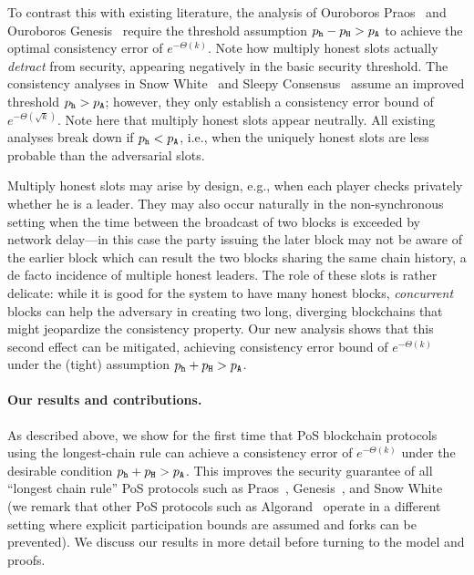 To contrast this with existing literature, the analysis of Ouroboros
Praos~\cite{Praos} and Ouroboros Genesis~\cite{Genesis}
require the threshold assumption $p_{\mathtt{h}} - p_{\mathtt{H}} > p_{\mathtt{A}}$ to achieve the
optimal consistency error of $e^{-\Theta(k)}$. Note how multiply
honest slots actually \emph{detract} from security, appearing
negatively in the basic security threshold. The consistency analyses
in Snow White~\cite{SnowWhite} and Sleepy Consensus~\cite{Sleepy}
assume an improved threshold $p_{\mathtt{h}} > p_{\mathtt{A}}$; however, they only
establish a consistency error bound of $e^{-\Theta(\sqrt{k})}$. Note
here that multiply honest slots appear neutrally. All existing
analyses break down if $p_{\mathtt{h}} < p_{\mathtt{A}}$, i.e., when the uniquely
honest slots are less probable than the adversarial slots.


Multiply honest slots may arise by design, e.g., when each player
checks privately whether he is a leader.  They may also occur
naturally in the non-synchronous setting when the time between the
broadcast of two blocks is exceeded by network delay---in this case
the party issuing the later block may not be aware of the earlier
block which can result the two blocks sharing the same chain history,
a de facto incidence of multiple honest leaders. The role of these
slots is rather delicate: while it is good for the system to have many
honest blocks, \emph{concurrent} blocks can help the adversary in
creating two long, diverging blockchains that might jeopardize the
consistency property. Our new analysis shows that this second effect
can be mitigated, achieving consistency error bound of
$e^{-\Theta(k)}$ under the (tight) assumption $p_{\mathtt{h}} + p_{\mathtt{H}} > p_{\mathtt{A}}$.



\paragraph{Our results and contributions.} 
As described above, we show for the first time that PoS blockchain
protocols using the longest-chain rule can achieve a consistency error
of $e^{-\Theta(k)}$ under the desirable condition
$p_{\mathtt{h}} + p_{\mathtt{H}} > p_{\mathtt{A}}$.  This improves the security guarantee of all
``longest chain rule''  PoS protocols such as Praos~\cite{Praos},
Genesis~\cite{Genesis}, and Snow White~\cite{SnowWhite}
(we remark that other PoS protocols such as Algorand~\cite{DBLP:journals/corr/Micali16} 
operate in a different setting where explicit participation bounds are assumed
and forks can be prevented).
We discuss
our results in more detail before turning to the model and proofs.

